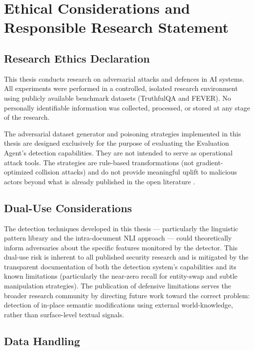 \chapter{Ethical Considerations and Responsible Research Statement}
\label{app:ethics}

\section{Research Ethics Declaration}

This thesis conducts research on adversarial attacks and defences in AI systems. All experiments were performed in a controlled, isolated research environment using publicly available benchmark datasets (TruthfulQA and FEVER). No personally identifiable information was collected, processed, or stored at any stage of the research.

The adversarial dataset generator and poisoning strategies implemented in this thesis are designed exclusively for the purpose of evaluating the Evaluation Agent's detection capabilities. They are not intended to serve as operational attack tools. The strategies are rule-based transformations (not gradient-optimized collision attacks) and do not provide meaningful uplift to malicious actors beyond what is already published in the open literature \parencite{zou2024poisoned, greshake2023indirect}.

\section{Dual-Use Considerations}

The detection techniques developed in this thesis --- particularly the linguistic pattern library and the intra-document NLI approach --- could theoretically inform adversaries about the specific features monitored by the detector. This dual-use risk is inherent to all published security research and is mitigated by the transparent documentation of both the detection system's capabilities and its known limitations (particularly the near-zero recall for entity-swap and subtle manipulation strategies). The publication of defensive limitations serves the broader research community by directing future work toward the correct problem: detection of in-place semantic modifications using external world-knowledge, rather than surface-level textual signals.

\section{Data Handling}

